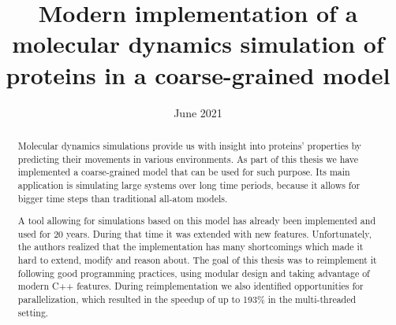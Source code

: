 \documentclass[licencjacka,en]{pracamgr}
\title{Modern implementation of a molecular dynamics simulation of proteins in a coarse-grained model}
\date{June 2021}
\begin{document}
\maketitle



\begin{abstract}
  Molecular dynamics simulations provide us with insight into proteins' properties by predicting their movements in various environments.
  As part of this thesis we have implemented a coarse-grained model that can be used for such purpose. Its main application is simulating large systems over long time periods, because it allows for bigger time steps than traditional all-atom models.
 
  A tool allowing for simulations based on this model has already been implemented and used for 20 years. During that time it was extended with new features. Unfortunately, the authors realized that the implementation 
  has many shortcomings which made it hard to extend, modify and reason about. 
  The goal of this thesis was to reimplement it following good programming practices, using modular design and taking advantage of modern C++ features. 
  During reimplementation we also identified opportunities for parallelization, which resulted in the speedup of up to 193\% in the multi-threaded setting.  
  
  
\end{abstract}
\end{document}
